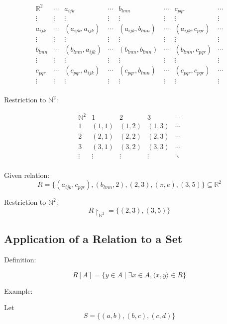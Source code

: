 \documentclass[12pt,a4paper,openany]{article}
\begin{document}
$$
\begin{array}{c|ccccccc}
\mathbb{R}^2 & \cdots & a_{ijk} & \cdots & b_{lmn} & \cdots & c_{pqr} & \cdots \\
\hline
\vdots & \vdots & \vdots & \vdots & \vdots & \vdots & \vdots & \vdots \\
a_{ijk} & \cdots & (a_{ijk},a_{ijk}) & \cdots & (a_{ijk},b_{lmn}) & \cdots & (a_{ijk},c_{pqr}) & \cdots \\
\vdots & \vdots & \vdots & \vdots & \vdots & \vdots & \vdots & \vdots \\
b_{lmn} & \cdots & (b_{lmn},a_{ijk}) & \cdots & (b_{lmn},b_{lmn}) & \cdots & (b_{lmn},c_{pqr}) & \cdots \\
\vdots & \vdots & \vdots & \vdots & \vdots & \vdots & \vdots & \vdots \\
c_{pqr} & \cdots & (c_{pqr},a_{ijk}) & \cdots & (c_{pqr},b_{lmn}) & \cdots & (c_{pqr},c_{pqr}) & \cdots \\
\vdots & \vdots & \vdots & \vdots & \vdots & \vdots & \vdots & \vdots \\
\end{array}
$$

Restriction to $\mathbb{N}^2$:

$$
\begin{array}{c|cccc}
\mathbb{N}^2 & 1 & 2 & 3 & \cdots \\
\hline
1 & (1,1) & (1,2) & (1,3) & \cdots \\
2 & (2,1) & (2,2) & (2,3) & \cdots \\
3 & (3,1) & (3,2) & (3,3) & \cdots \\
\vdots & \vdots & \vdots & \vdots & \ddots \\
\end{array}
$$

Given relation:
$$R = \{(a_{ijk}, c_{pqr}), (b_{lmn}, 2), (2, 3), (\pi, e), (3, 5)\} \subseteq \mathbb{R}^2$$

Restriction to $\mathbb{N}^2$:
$$R \upharpoonright_{\mathbb{N}^2} = \{(2, 3), (3, 5)\}$$

\subsection{Application of a Relation to a Set}

Definition:

$$
R[A] = \{ y \in A \mid \exists x \in A, \langle x, y \rangle \in R \}
$$

Example:

Let $$S = \{ (a,b), (b,c), (c,d) \}$$
\end{document}

